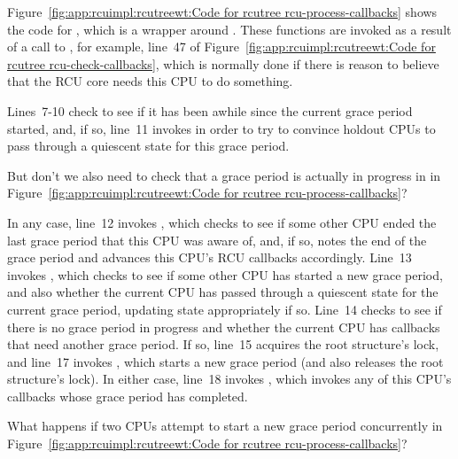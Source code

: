 Figure~\ref{fig:app:rcuimpl:rcutreewt:Code for rcutree rcu-process-callbacks}
shows the code for , which is a wrapper around
.
These functions are invoked as a result of a call to
, for example, line~47 of
Figure~\ref{fig:app:rcuimpl:rcutreewt:Code for rcutree rcu-check-callbacks},
which is normally done if there is reason to believe that the RCU core
needs this CPU to do something.

Lines~7-10 check to see if it has been awhile since the current grace
period started, and, if so, line~11 invokes 
in order to try to convince holdout CPUs to pass through a quiescent
state for this grace period.

\QuickQuiz{}
	But don't we also need to check that a grace period is
	actually in progress in  in
	Figure~\ref{fig:app:rcuimpl:rcutreewt:Code for rcutree rcu-process-callbacks}?
 \QuickQuizEnd

In any case, line~12 invokes , which checks to
see if some other CPU ended the
last grace period that this CPU was aware of, and, if so, notes the
end of the grace period and advances this CPU's RCU callbacks
accordingly.
Line~13 invokes , which checks to
see if some other CPU has started a new grace period, and also whether
the current CPU has passed through a quiescent state for the current
grace period, updating state appropriately if so.
Line~14 checks to see if there is no grace period in progress and whether
the current CPU has callbacks that need another grace period.
If so, line~15 acquires the root  structure's lock,
and line~17 invokes , which starts a new grace
period (and also releases the root  structure's lock).
In either case, line~18 invokes , which
invokes any of this CPU's callbacks whose grace period has completed.

\QuickQuiz{}
	What happens if two CPUs attempt to start a new grace
	period concurrently in
	Figure~\ref{fig:app:rcuimpl:rcutreewt:Code for rcutree rcu-process-callbacks}?
 \QuickQuizEnd

